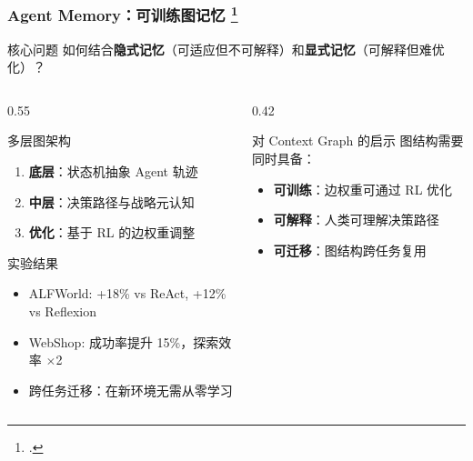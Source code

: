 \documentclass[aspectratio=169,10pt]{beamer}
\let\oldcite\cite
\renewcommand{\cite}[1]{\oldcite{#1}\footcitetext{#1}}
\begin{document}
\begin{frame}
  \frametitle{Agent Memory：可训练图记忆 \cite{xia2025trainable}}

  \begin{block}{核心问题}
    如何结合\textbf{隐式记忆}（可适应但不可解释）和\textbf{显式记忆}（可解释但难优化）？
  \end{block}

  \begin{columns}[T]
    \begin{column}{0.55\textwidth}
      \begin{block}{多层图架构}
        \begin{enumerate}
          \item \textbf{底层}：状态机抽象 Agent 轨迹
          \item \textbf{中层}：决策路径与战略元认知
          \item \textbf{优化}：基于 RL 的边权重调整
        \end{enumerate}
      \end{block}

      \begin{block}{实验结果}
        \begin{itemize}
          \item ALFWorld: +18\% vs ReAct, +12\% vs Reflexion
          \item WebShop: 成功率提升 15\%，探索效率 $\times$2
          \item 跨任务迁移：在新环境无需从零学习
        \end{itemize}
      \end{block}
    \end{column}

    \begin{column}{0.42\textwidth}
      \begin{alertblock}{对 Context Graph 的启示}
        图结构需要同时具备：
        \begin{itemize}
          \item \textbf{可训练}：边权重可通过 RL 优化
          \item \textbf{可解释}：人类可理解决策路径
          \item \textbf{可迁移}：图结构跨任务复用
        \end{itemize}
      \end{alertblock}
    \end{column}
  \end{columns}
\end{frame}
\end{document}
